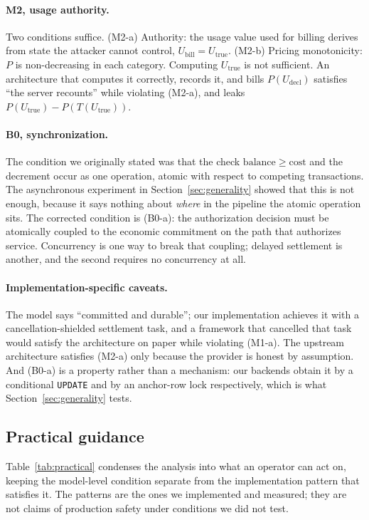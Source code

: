 \documentclass[preprint,3p,authoryear,12pt]{elsarticle}
\begin{document}
\paragraph{M2, usage authority.}
Two conditions suffice. (M2-a) Authority: the usage value used for billing derives from
state the attacker cannot control, $U_{\mathrm{bill}} = U_{\mathrm{true}}$. (M2-b)
Pricing monotonicity: $P$ is non-decreasing in each category. Computing $U_{\mathrm{true}}$
is not sufficient. An architecture that computes it correctly, records it, and bills
$P(U_{\mathrm{decl}})$ satisfies ``the server recounts'' while violating (M2-a), and
leaks $P(U_{\mathrm{true}}) - P(T(U_{\mathrm{true}}))$.

\paragraph{B0, synchronization.}
The condition we originally stated was that the check $\mathrm{balance} \ge
\mathrm{cost}$ and the decrement occur as one operation, atomic with respect to competing
transactions. The asynchronous experiment in Section~\ref{sec:generality} showed that
this is not enough, because it says nothing about \emph{where} in the pipeline the atomic
operation sits. The corrected condition is (B0-a): the authorization decision must be
atomically coupled to the economic commitment on the path that authorizes service.
Concurrency is one way to break that coupling; delayed settlement is another, and the
second requires no concurrency at all.

\paragraph{Implementation-specific caveats.}
The model says ``committed and durable''; our implementation achieves it with a
cancellation-shielded settlement task, and a framework that cancelled that task would
satisfy the architecture on paper while violating (M1-a). The upstream architecture
satisfies (M2-a) only because the provider is honest by assumption. And (B0-a) is a
property rather than a mechanism: our backends obtain it by a conditional \texttt{UPDATE}
and by an anchor-row lock respectively, which is what Section~\ref{sec:generality} tests.

\subsection{Practical guidance}
Table~\ref{tab:practical} condenses the analysis into what an operator can act on,
keeping the model-level condition separate from the implementation pattern that satisfies
it. The patterns are the ones we implemented and measured; they are not claims of
production safety under conditions we did not test.
\end{document}
